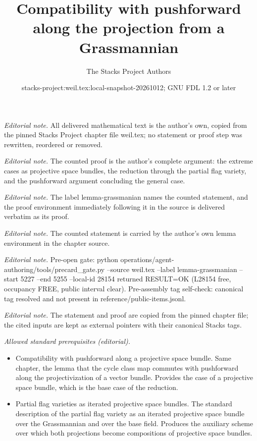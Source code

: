\documentclass[10pt,a4paper]{amsart}
\title{Compatibility with pushforward along the projection from a Grassmannian}
\author{The Stacks Project Authors}
\date{stacks-project:weil.tex:local-snapshot-20261012; GNU FDL 1.2 or later}
\theoremstyle{plain}
\theoremstyle{definition}
\theoremstyle{remark}
\numberwithin{equation}{subsection}
\begin{document}
\maketitle
\noindent\textit{Editorial note.} All delivered mathematical text is the author's own, copied from the pinned Stacks Project chapter file weil.tex; no statement or proof step was rewritten, reordered or removed.\par\medskip
\noindent\textit{Editorial note.} The counted proof is the author's complete argument: the extreme cases as projective space bundles, the reduction through the partial flag variety, and the pushforward argument concluding the general case.\par\medskip
\noindent\textit{Editorial note.} The label lemma-grassmanian names the counted statement, and the proof environment immediately following it in the source is delivered verbatim as its proof.\par\medskip
\noindent\textit{Editorial note.} The counted statement is carried by the author's own lemma environment in the chapter source.\par\medskip
\noindent\textit{Editorial note.} Pre-open gate: python operations/agent-authoring/tools/precard\_gate.py --source weil.tex --label lemma-grassmanian --start 5227 --end 5255 --local-id 28154 returned RESULT=OK (L28154 free, occupancy FREE, public interval clear). Pre-assembly tag self-check: canonical tag resolved and not present in reference/public-items.jsonl.\par\medskip
\noindent\textit{Editorial note.} The statement and proof are copied from the pinned chapter file; the cited inputs are kept as external pointers with their canonical Stacks tags.\par\medskip
\noindent\textit{Allowed standard prerequisites (editorial).}\begin{itemize}
\item Compatibility with pushforward along a projective space bundle. Same chapter, the lemma that the cycle class map commutes with pushforward along the projectivization of a vector bundle. Provides the case of a projective space bundle, which is the base case of the reduction.
\item Partial flag varieties as iterated projective space bundles. The standard description of the partial flag variety as an iterated projective space bundle over the Grassmannian and over the base field. Produces the auxiliary scheme over which both projections become compositions of projective space bundles.
\end{itemize}\medskip
\end{document}

